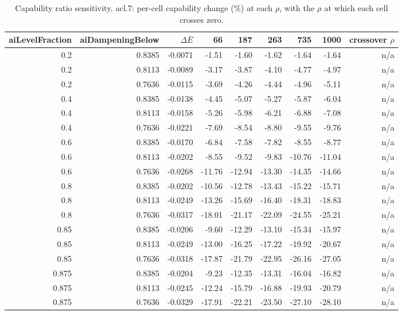 \begin{table}[htbp]
  \centering
  \caption{Capability ratio sensitivity, acl.7: per-cell capability change (\%) at each $\rho$, with the $\rho$ at which each cell crosses zero.}
  \label{tab:rho-acl-7-cells}
  \begin{tabular}{r r r r r r r r r}
    \toprule
    aiLevelFraction & aiDampeningBelow & $\Delta\overline{E}$ & 66 & 187 & 263 & 735 & 1000 & crossover $\rho$ \\
    \midrule
    0.2 & 0.8385 & -0.0071 & -1.51 & -1.60 & -1.62 & -1.64 & -1.64 & n/a \\
    0.2 & 0.8113 & -0.0089 & -3.17 & -3.87 & -4.10 & -4.77 & -4.97 & n/a \\
    0.2 & 0.7636 & -0.0115 & -3.69 & -4.26 & -4.44 & -4.96 & -5.11 & n/a \\
    0.4 & 0.8385 & -0.0138 & -4.45 & -5.07 & -5.27 & -5.87 & -6.04 & n/a \\
    0.4 & 0.8113 & -0.0158 & -5.26 & -5.98 & -6.21 & -6.88 & -7.08 & n/a \\
    0.4 & 0.7636 & -0.0221 & -7.69 & -8.54 & -8.80 & -9.55 & -9.76 & n/a \\
    0.6 & 0.8385 & -0.0170 & -6.84 & -7.58 & -7.82 & -8.55 & -8.77 & n/a \\
    0.6 & 0.8113 & -0.0202 & -8.55 & -9.52 & -9.83 & -10.76 & -11.04 & n/a \\
    0.6 & 0.7636 & -0.0268 & -11.76 & -12.94 & -13.30 & -14.35 & -14.66 & n/a \\
    0.8 & 0.8385 & -0.0202 & -10.56 & -12.78 & -13.43 & -15.22 & -15.71 & n/a \\
    0.8 & 0.8113 & -0.0249 & -13.26 & -15.69 & -16.40 & -18.31 & -18.83 & n/a \\
    0.8 & 0.7636 & -0.0317 & -18.01 & -21.17 & -22.09 & -24.55 & -25.21 & n/a \\
    0.85 & 0.8385 & -0.0206 & -9.60 & -12.29 & -13.10 & -15.34 & -15.97 & n/a \\
    0.85 & 0.8113 & -0.0249 & -13.00 & -16.25 & -17.22 & -19.92 & -20.67 & n/a \\
    0.85 & 0.7636 & -0.0318 & -17.87 & -21.79 & -22.95 & -26.16 & -27.05 & n/a \\
    0.875 & 0.8385 & -0.0204 & -9.23 & -12.35 & -13.31 & -16.04 & -16.82 & n/a \\
    0.875 & 0.8113 & -0.0245 & -12.24 & -15.79 & -16.88 & -19.93 & -20.79 & n/a \\
    0.875 & 0.7636 & -0.0329 & -17.91 & -22.21 & -23.50 & -27.10 & -28.10 & n/a \\
    \bottomrule
  \end{tabular}
\end{table}
